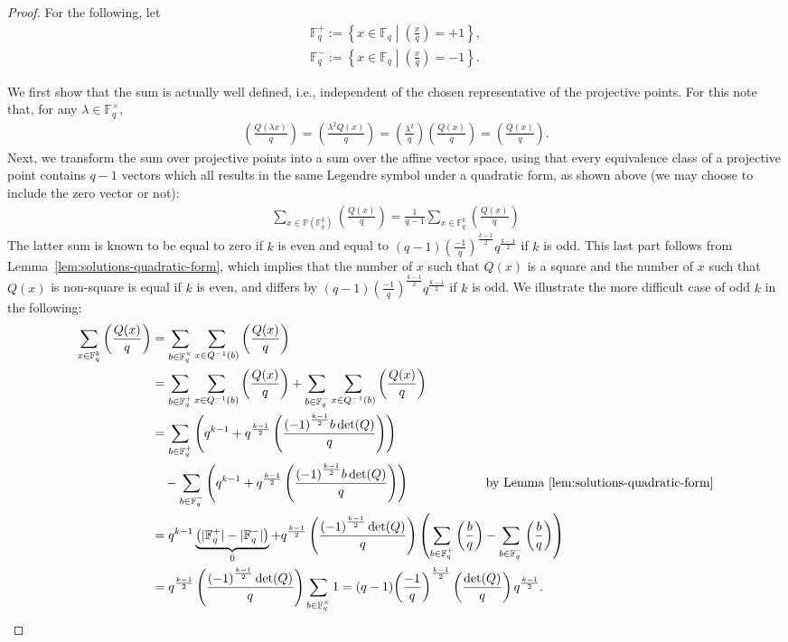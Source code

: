 \documentclass[11pt]{article}
\theoremstyle{definition}
\newcommand{\F}{\mathbb{F}}
\newcommand{\Proj}{\mathbb{P}}
\newcommand{\Leg}[2]{\left(\frac{#1}{#2}\right)}                       %
\begin{document}
\begin{proof}
	For the following, let
	\begin{align*}
		\F_q^+ := \left\{x \in \F_q \middle| \Leg{x}{q} = +1 \right\}, \\
		\F_q^- := \left\{x \in \F_q \middle| \Leg{x}{q} = -1 \right\}.
	\end{align*}

	We first show that the sum is actually well defined, i.e., independent of the chosen representative of the projective points.
	For this note that, for any $\lambda \in \F_q^\times$,
	\begin{align*}
		\Leg{Q(\lambda x)}{q}
		= \Leg{\lambda^2 Q(x)}{q}
		= \Leg{\lambda^2 }{q} \Leg{ Q(x)}{q}
		= \Leg{Q(x)}{q}.
	\end{align*}
	Next, we transform the sum over projective points into a sum over the affine vector space, using that every equivalence class of a projective point contains $q-1$ vectors which all results in the same Legendre symbol under a quadratic form, as shown above (we may choose to include the zero vector or not):
	\begin{align*}
		\sum_{x \in \Proj(\F_q^k)} \Leg{Q(x)}{q}
		= \frac{1}{q - 1} \sum_{x \in \F_q^k} \Leg{Q(x)}{q}
	\end{align*}
	The latter sum is known to be equal to zero if $k$ is even and equal to $(q - 1) {\Leg{-1}{q}}^{\frac{k - 1}{2}} q^{\frac{k - 1}{2}}$ if $k$ is odd.
	This last part follows from Lemma~\ref{lem:solutions-quadratic-form}, which implies that the number of $x$ such that $Q(x)$ is a square and the number of $x$ such that $Q(x)$ is non-square is equal if $k$ is even, and differs by $(q - 1) {\Leg{-1}{q}}^{\frac{k - 1}{2}} q^{\frac{k - 1}{2}}$ if $k$ is odd.
	We illustrate the more difficult case of odd $k$ in the following:
	\begin{align*}
		   \sum_{x\in \F_q^k} \Leg{Q(x)}{q}
		&= \sum_{b \in \F_q^\times} \sum_{x \in Q^{-1}(b)} \Leg{Q(x)}{q} \\
		&= \sum_{b \in \F_q^+} \sum_{x \in Q^{-1}(b)} \Leg{Q(x)}{q}
		 + \sum_{b \in \F_q^-} \sum_{x \in Q^{-1}(b)} \Leg{Q(x)}{q} \\
		&= \sum_{b \in \F_q^+} \left( q^{k - 1} + q^{\frac{k - 1}{2}} \Leg{{(-1)}^{\frac{k-1}{2}} b \det(Q)}{q} \right) \\
		&\quad - \sum_{b \in \F_q^-} \left( q^{k - 1} + q^{\frac{k - 1}{2}} \Leg{{(-1)}^{\frac{k - 1}{2}} b \det(Q)}{q} \right) \hspace{2cm} \text{ by Lemma~\ref{lem:solutions-quadratic-form}}\\
		&=q^{k-1}\underbrace{\left(|\F_q^+|- |\F_q^-| \right)}_0 +  q^{\frac{k - 1}{2}} \Leg{{(-1)}^{\frac{k - 1}{2}} \det(Q)}{q} \left(\sum_{b \in \F_q^+} \Leg{b}{q}- \sum_{b \in \F_q^-} \Leg{b}{q}\right) \\
		&= q^{\frac{k - 1}{2}} \Leg{{(-1)}^{\frac{k - 1}{2}} \det(Q)}{q} \sum_{b \in \F_q^\times} 1 = (q - 1) {\Leg{-1}{q}}^{\frac{k - 1}{2}} \Leg{\det(Q)}{q} q^{\frac{k - 1}{2}}.
	\end{align*}
\end{proof}
\end{document}
